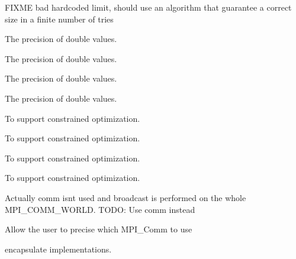 \begin{DoxyRefList}
\label{todo__todo000024}%
%
F\+I\+X\+ME bad hardcoded limit, should use an algorithm that guarantee a correct size in a finite number of tries  
\item[Member \mbox{\hyperlink{class_i_o_hprofiler__csv__logger_ae1f87543ebe3b26dc0d7b6b80a0dead6}{I\+O\+Hprofiler\+\_\+csv\+\_\+logger$<$ T $>$::write\+\_\+line}} (const size\+\_\+t evaluations, const double y, const double best\+\_\+so\+\_\+far\+\_\+y, const double transformed\+\_\+y, const double best\+\_\+so\+\_\+far\+\_\+transformed\+\_\+y)]\label{todo__todo000031}%
%
The precision of double values. 

\label{todo__todo000043}%
%
The precision of double values. 

\label{todo__todo000045}%
%
The precision of double values. 

\label{todo__todo000057}%
%
The precision of double values.  
\item[Member \mbox{\hyperlink{class_i_o_hprofiler__problem_a8e341f89def43a2ef8408509626ebbf8}{I\+O\+Hprofiler\+\_\+problem$<$ Input\+Type $>$::reset\+\_\+problem}} ()]\label{todo__todo000036}%
%
To support constrained optimization. 

\label{todo__todo000042}%
%
To support constrained optimization. 

\label{todo__todo000050}%
%
To support constrained optimization. 

\label{todo__todo000056}%
%
To support constrained optimization.  
\item[Member \mbox{\hyperlink{group___parallel_ga43a042b471a84b187c77bca43368db6a}{mpi::broadcast}} (communicator \&comm, int value, int root)]\label{todo__todo000060}%
%
Actually comm isn\textquotesingle{}t used and broadcast is performed on the whole M\+P\+I\+\_\+\+C\+O\+M\+M\+\_\+\+W\+O\+R\+LD. T\+O\+DO\+: Use comm instead  
\item[Member \mbox{\hyperlink{classmpi_1_1communicator_a0e17d90b784f078d3e22a488290cb6aa}{mpi::communicator::communicator}} ()]\label{todo__todo000061}%
%
Allow the user to precise which M\+P\+I\+\_\+\+Comm to use  
\item[File \mbox{\hyperlink{eo_2src_2serial_2_utils_8h}{Utils.h}} ]\label{todo__todo000062}%
%
encapsulate implementations.
\end{DoxyRefList}